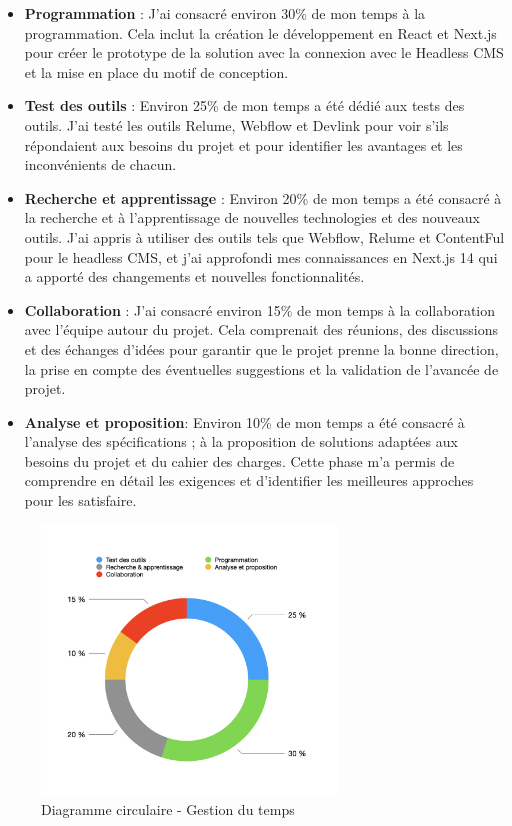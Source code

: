 \begin{itemize}
\item \textbf{Programmation} : J'ai consacré environ 30\% de mon temps à la programmation. Cela inclut la création le développement en React et Next.js pour créer le prototype de la solution avec la connexion avec le Headless CMS et la mise en place du motif de conception.

\item \textbf{Test des outils} : Environ 25\% de mon temps a été dédié aux tests des outils. J'ai testé les outils Relume, Webflow et Devlink pour voir s'ils répondaient aux besoins du projet et pour identifier les avantages et les inconvénients de chacun.

\item \textbf{Recherche et apprentissage} : Environ 20\% de mon temps a été consacré à la recherche et à l'apprentissage de nouvelles technologies et des nouveaux outils. J'ai appris à utiliser des outils tels que Webflow, Relume et ContentFul pour le headless CMS, et j'ai approfondi mes connaissances en Next.js 14 qui a apporté des changements et nouvelles fonctionnalités.
\item \textbf{Collaboration} : J'ai consacré environ 15\% de mon temps à la collaboration avec l'équipe autour du projet. Cela comprenait des réunions, des discussions et des échanges d'idées pour garantir que le projet prenne la bonne direction, la prise en compte des éventuelles suggestions et la validation de l'avancée de projet.

\item \textbf{Analyse et proposition}: Environ 10\% de mon temps a été consacré à l'analyse des spécifications ; à la proposition de solutions adaptées aux besoins du projet et du cahier des charges. Cette phase m'a permis de comprendre en détail les exigences et d'identifier les meilleures approches pour les satisfaire.
\end{itemize}
\begin{figure}[ht] 
    \centering
    \includegraphics[width=0.7\textwidth]{Includes/Images/gestionTemps.png}
    \caption{Diagramme circulaire - Gestion du temps}
    \label{fig:Diagramme circulaire - Gestion du temps}
\end{figure} 
